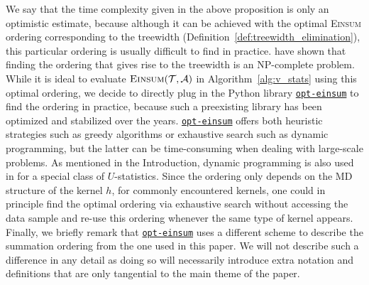 \documentclass[letterpaper,11pt]{article}
\def\Einsum{\textsc{Einsum}}
\newcommand{\libref}[2]{\href{#2}{\texttt{#1}}}
\newcommand{\tensorcontraction}{\textsc{Einsum}}
\def\package{\libref{u-stats}{https://github.com/zrq1706/U-Statistics-Python}}
\newcommand{\opteinsum}{\libref{opt-einsum}{https://dgasmith.github.io/opt_einsum/}}
\begin{document}
\begin{bibunit}[plainnat]
\begin{remark}[\Einsum{} summation ordering in practice]
\label{rem:ordering}
We say that the time complexity given in the above proposition is only an optimistic estimate, because although it can be achieved with the optimal \Einsum{} ordering corresponding to the treewidth (Definition~\ref{def:treewidth_elimination}), this particular ordering is usually difficult to find in practice. \citet{arnborg1987complexity} have shown that finding the ordering that gives rise to the treewidth is an NP-complete problem. While it is ideal to evaluate $\tensorcontraction(\calT, \calA)$ in Algorithm~\ref{alg:v_stats} using this optimal ordering, we decide to directly plug in the Python library \opteinsum{} \citep{daniel2018opt} to find the ordering in practice, because such a preexisting library has been optimized and stabilized over the years. \opteinsum{} offers both heuristic strategies such as greedy algorithms or exhaustive search such as dynamic programming, but the latter can be time-consuming when dealing with large-scale problems. As mentioned in the Introduction, dynamic programming is also used in \citet{zhang2025adaptive} for a special class of $U$-statistics. Since the ordering only depends on the MD structure of the kernel $h$, for commonly encountered kernels, one could in principle find the optimal ordering via exhaustive search without accessing the data sample and re-use this ordering whenever the same type of kernel appears. Finally, we briefly remark that \opteinsum{} uses a different scheme to describe the summation ordering from the one used in this paper. We will not describe such a difference in any detail as doing so will necessarily introduce extra notation and definitions that are only tangential to the main theme of the paper.


\end{remark}


\end{bibunit}
\end{document}
